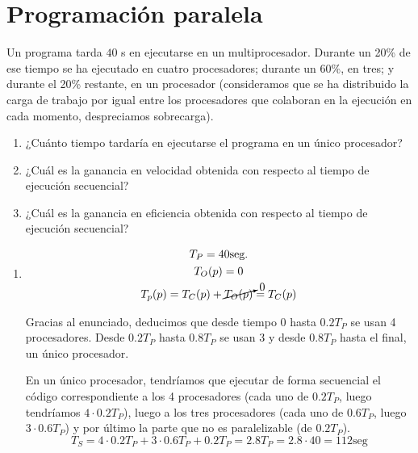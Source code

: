 \section{Programación paralela}

\begin{ejercicio}
    Un programa tarda $40$ s en ejecutarse en un multiprocesador. Durante un 20\% de ese tiempo se
    ha ejecutado en cuatro procesadores; durante un 60\%, en tres; y durante el 20\% restante, en un procesador
    (consideramos que se ha distribuido la carga de trabajo por igual entre los procesadores que colaboran en la
    ejecución en cada momento, despreciamos sobrecarga).
    \begin{enumerate}
        \item ¿Cuánto tiempo tardaría en ejecutarse el programa
        en un único procesador?
        \item ¿Cuál es la ganancia en velocidad obtenida con respecto al tiempo de ejecución
        secuencial?
        \item ¿Cuál es la ganancia en eficiencia obtenida con respecto al tiempo de ejecución
        secuencial?
    \end{enumerate}

    \begin{enumerate}
        \item
        \begin{gather*}
            T_P = 40 \text{seg.} \\
            T_O(p) = 0 \\
            T_p(p) = T_C(p) + \cancelto{0}{T_O(p)} = T_C(p)
        \end{gather*}

        Gracias al enunciado, deducimos que desde tiempo 0 hasta $0.2T_P$ se usan 4 procesadores. Desde $0.2T_P$ hasta $0.8T_P$ se usan 3 y desde $0.8T_P$ hasta el final, un único procesador.

        En un único procesador, tendríamos que ejecutar de forma secuencial el código correspondiente a los 4 procesadores (cada uno de $0.2T_P$, luego tendríamos $4\cdot 0.2T_P$), luego a los tres procesadores (cada uno de $0.6T_P$, luego $3\cdot 0.6T_P$) y por último la parte que no es paralelizable (de $0.2T_P$).
        \begin{equation*}
            T_S = 4\cdot 0.2T_P + 3\cdot 0.6T_P + 0.2T_P = 2.8T_P = 2.8 \cdot 40= 112 \text{seg}
        \end{equation*}


\end{enumerate}
\end{ejercicio}
